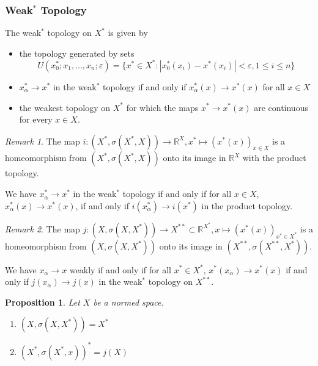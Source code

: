 \documentclass[12pt, reqno]{article}
\theoremstyle{plain}
\newtheorem*{proposition}{Proposition}
\theoremstyle{definition}
\theoremstyle{remark}
\newtheorem*{remark}{Remark}
\renewcommand{\epsilon}{\varepsilon}
\newcommand{\RR}{\mathbb{R}}
\begin{document}
\subsubsection*{Weak$^*$ Topology}

The weak$^*$ topology on $X^*$ is given by 
\begin{itemize}
    \item the topology generated by sets 
    \[
    U(x_0^*; x_1, \dots, x_n; \epsilon) = \{x^* \in X^*: |x_0^*(x_i) - x^*(x_i)| < \epsilon, 1 \leq i \leq n\}
    \]

    \item $x_\alpha^* \rightarrow x^*$ in the weak$^*$ topology if and only if $x_\alpha^*(x) \rightarrow x^*(x)$ for 
    all $x \in X$
    
    \item the weakest topology on $X^*$ for which the maps $x^* \rightarrow x^*(x)$ are continuous for every $x \in X$.
\end{itemize}

\begin{remark}
    The map $i: (X^*, \sigma(X^*, X)) \rightarrow \RR^X, x^* \mapsto {(x^*(x))}_{x \in X}$ is a homeomorphism from $(X^*, \sigma(X^*, X))$ onto its
    image in $\RR^X$ with the product topology.

    We have $x_\alpha^* \rightarrow x^*$ in the weak$^*$ topology if and only if for all $x \in X$, $x_\alpha^*(x) \rightarrow x^*(x)$,
    if and only if $i(x_\alpha^*) \rightarrow i(x^*)$ in the product topology. 
\end{remark}

\begin{remark}
    The map $j: (X, \sigma(X, X^*)) \rightarrow X^{**} \subset \RR^{X^*}, x \mapsto (x^*(x))_{x^* \in X^*}$ is a homeomorphism
    from $(X, \sigma(X, X^*))$ onto its image in $(X^{**}, \sigma(X^{**}, X^*))$. 

    We have $x_\alpha \rightarrow x$ weakly if and only if for all $x^* \in X^*$, $x^*(x_\alpha) \rightarrow x^*(x)$
    if and only if $j(x_\alpha) \rightarrow j(x)$ in the weak$^*$ topology on $X^{**}$. 
\end{remark}

\begin{proposition}
    Let $X$ be a normed space. 
    \begin{enumerate}
        \item $(X, \sigma(X, X^*)) = X^*$
        \item $(X^*, \sigma(X^*, x))^* = j(X)$
    \end{enumerate}
\end{proposition}
\end{document}
